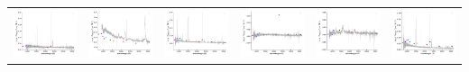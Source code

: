 \begin{center}
\begin{longtable}{l l l l l l }
    \includegraphics[width=0.3\linewidth, clip]{Figs/Figs-sdss/spec-1476-52964-0017-SPLUS-s02s08-040860.pdf} & \includegraphics[width=0.3\linewidth, clip]{Figs/Figs-sdss/spec-1827-53531-0289-SPLUS-n05n50-033851.pdf} & \includegraphics[width=0.3\linewidth, clip]{Figs/Figs-sdss/spec-3589-55186-0374-STRIPE82-0015-013616.pdf} & \includegraphics[width=0.3\linewidth, clip]{Figs/Figs-sdss/spec-4037-55631-0460-SPLUS-n02s44-029163.pdf} & \includegraphics[width=0.3\linewidth, clip]{Figs/Figs-sdss/spec-4220-55447-0004-STRIPE82-0013-055791.pdf} & \includegraphics[width=0.3\linewidth, clip]{Figs/Figs-sdss/spec-4748-55631-0047-SPLUS-n02n25-025655.pdf} \\

\end{longtable}
\end{center}

